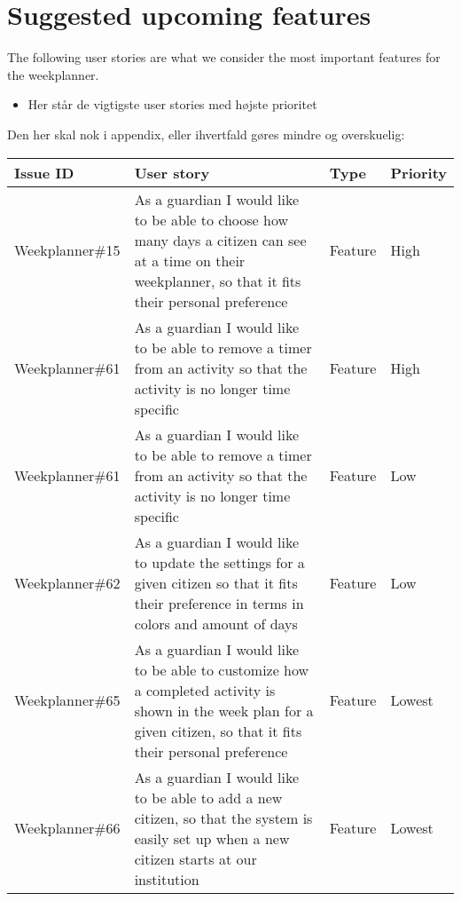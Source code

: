 \section{Suggested upcoming features}
The following user stories are what we consider the most important features for the weekplanner.



\begin{itemize}
    \item Her står de vigtigste user stories med højste prioritet
\end{itemize}

Den her skal nok i appendix, eller ihvertfald gøres mindre og overskuelig:

\begin{longtable}{|p{2.9cm}|p{7cm}|p{1.4cm}|p{1.5cm}|}
    \hline
    Issue ID        & User story                                                                                                                                                                 & Type & Priority     \\ \hline
    Weekplanner\#15  & As a guardian I would like to be able to choose how many days a citizen can see at a time on their weekplanner, so that it fits their personal preference                  & Feature & High    \\ \hline
    Weekplanner\#61  & As a guardian I would like to be able to remove a timer from an activity so that the activity is no longer time specific                                                   & Feature & High    \\ \hline
    Weekplanner\#61  & As a guardian I would like to be able to remove a timer from an activity so that the activity is no longer time specific                                                   & Feature & Low    \\ \hline
    Weekplanner\#62  & As a guardian I would like to update the settings for a given citizen so that it fits their preference in terms in colors and amount of days                               & Feature & Low  \\ \hline
    Weekplanner\#65  & As a guardian I would like to be able to customize how a completed activity is shown in the week plan for a given citizen, so that it fits their personal preference       & Feature & Lowest  \\ \hline
    Weekplanner\#66  & As a guardian I would like to be able to add a new citizen, so that the system is easily set up when a new citizen starts at our institution                              & Feature & Lowest \\ \hline

\end{longtable}
